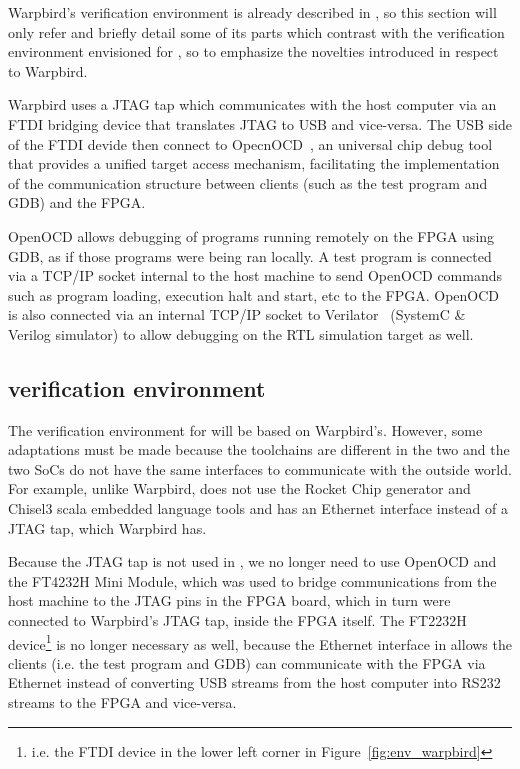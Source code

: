Warpbird's verification environment is already described in \cite{bib:warpbird}, so this section will only refer and briefly detail some of its parts which contrast with the verification environment envisioned for \socname, so to emphasize the novelties introduced in respect to Warpbird.

Warpbird uses a JTAG tap which communicates with the host computer via an FTDI bridging device that translates JTAG to USB and vice-versa. The USB side of the FTDI devide then connect to OpecnOCD~\cite{bib:openocd}, an universal chip debug tool that provides a unified target access mechanism, facilitating the implementation of the communication structure between clients (such as the test program and GDB) and the FPGA.

OpenOCD allows debugging of programs running remotely on the FPGA using GDB, as if those programs were being ran locally. A test program is connected via a TCP/IP socket internal to the host machine to send OpenOCD commands such as program loading, execution halt and start, etc to the FPGA. OpenOCD is also connected via an internal TCP/IP socket to Verilator~\cite{bib:verilator} (SystemC \& Verilog simulator) to allow debugging on the RTL simulation target as well.

\subsection{\socname verification environment}
The verification environment for \socname will be based on Warpbird's. However, some adaptations must be made because the toolchains are different in the two and the two SoCs do not have the same interfaces to communicate with the outside world. For example, unlike Warpbird, \socname does not use the Rocket Chip generator and Chisel3 scala embedded language tools and has an Ethernet interface instead of a JTAG tap, which Warpbird has.

Because the JTAG tap is not used in \socname, we no longer need to use OpenOCD and the FT4232H Mini Module, which was used to bridge communications from the host machine to the JTAG pins in the FPGA board, which in turn were connected to Warpbird's JTAG tap, inside the FPGA itself. The FT2232H device\footnote{i.e. the FTDI device in the lower left corner in Figure~\ref{fig:env_warpbird}} is no longer necessary as well, because the Ethernet interface in \socname allows the clients (i.e. the test program and GDB) can communicate with the FPGA via Ethernet instead of converting USB streams from the host computer into RS232 streams to the FPGA and vice-versa.

